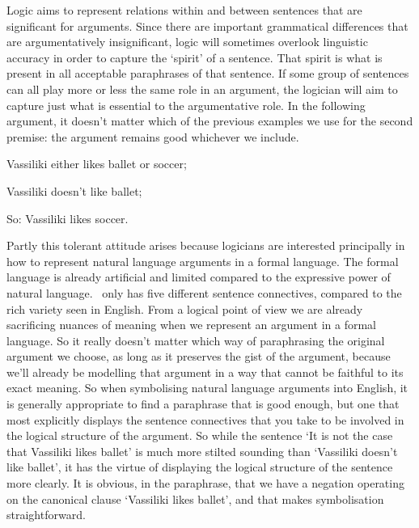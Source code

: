 Logic aims to represent relations within and between sentences that are significant for arguments. Since there are important grammatical differences that are argumentatively insignificant, logic will sometimes overlook linguistic accuracy in order to capture the ‘spirit’ of a sentence. That spirit is what is present in all acceptable paraphrases of that sentence. If some group of sentences can all play more or less the same role in an argument, the logician will aim to capture just what is essential to the argumentative role. In the following argument, it doesn't matter which of the previous examples we use for the second premise: the argument remains good whichever we include. \begin{earg}
	\item Vassiliki either likes ballet or soccer;
	\item Vassiliki doesn’t like ballet;
	\item[So:] Vassiliki likes soccer.
\end{earg} 

Partly this tolerant attitude arises because logicians are interested principally in how to represent natural language arguments in a formal language. The formal language is already artificial and limited compared to the expressive power of natural language. \TFL\ only has five different sentence connectives, compared to the rich variety seen in English. From a logical point of view we are already sacrificing nuances of meaning when we represent an argument in a formal language. So it really doesn't matter which way of paraphrasing the original argument we choose, as long as it preserves the gist of the argument, because we'll already be modelling that argument in a way that cannot be faithful to its exact meaning. So when symbolising natural language arguments into English, it is generally appropriate to find a paraphrase that is good enough, but one that most explicitly displays the sentence connectives that you take to be involved in the logical structure of the argument. So while the sentence `It is not the case that Vassiliki likes ballet' is much more stilted sounding than `Vassiliki doesn't like ballet', it has the virtue of displaying the logical structure of the sentence more clearly. It is obvious, in the paraphrase, that we have a negation operating on the canonical clause `Vassiliki likes ballet', and that makes symbolisation straightforward.

